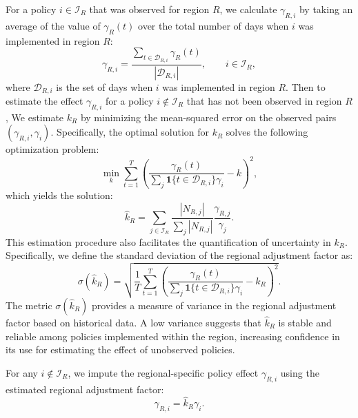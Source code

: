 \documentclass[msom,blindrev]{informs3} %
\begin{document}
For a policy $i \in \mathcal{I}_R$ that was observed for region $R$, we calculate $\gamma_{R,i}$ by taking an average of the value of $\gamma_{R}(t)$ over the total number of days when $i$ was implemented in region $R$:
\begin{equation}
    \gamma_{R,i} = \frac{\sum_{t \in \mathcal{D}_{R,i}} \gamma_{R}(t)}{|\mathcal{D}_{R,i}|}, \qquad  i \in \mathcal{I}_R,
    \label{eq:obsgamma}
\end{equation}
where $\mathcal{D}_{R,i}$ is the set of days when $i$ was implemented in region $R$. Then to estimate the effect $\gamma_{R,i}$ for a policy $i \not \in \mathcal{I}_R$ that has not been observed in region $R$, We estimate $k_R$ by minimizing the mean-squared error on the observed pairs $(\gamma_{R,i},\gamma_i)$. Specifically, the optimal solution for $k_R$ solves the following optimization problem: 
\begin{equation}
    \min_{k} \sum_{t=1}^T \left(\frac{\gamma_R(t)}{\sum_j \mathbf{1}\{t \in \mathcal{D}_{R,i}\} \gamma_i} - k\right)^2, \label{eq:equivalent}
\end{equation}
which yields the solution:
\begin{equation}
    \hat{k}_R = \sum_{j \in \mathcal{I}_R} 
    \frac{|N_{R,j}|}{\sum_j |N_{R,j}|} \frac{ \gamma_{R,j}}{\gamma_{j}}.
\end{equation}
This estimation procedure also facilitates the quantification of uncertainty in $k_R$. Specifically, we define the standard deviation of the regional adjustment factor as:
\begin{equation}
    \sigma( \hat{k}_R) = \sqrt{\frac{1}{T} \sum_{t=1}^T \left(\frac{\gamma_R(t)}{\sum_j \mathbf{1}\{t \in \mathcal{D}_{R,i}\} \gamma_i} - k_R\right)^2}. \label{eq:uncertainty}
\end{equation}
The metric $\sigma( \hat{k}_R)$ provides a measure of variance in the regional adjustment factor based on historical data. A low variance suggests that $ \hat{k}_R$ is stable and reliable among policies implemented within the region, increasing confidence in its use for estimating the effect of unobserved policies.

For any $i \not \in \mathcal{I}_R$, we impute the regional-specific policy effect $\gamma_{R,i}$ using the estimated regional adjustment factor:
\begin{equation}
    \gamma_{R,i} =  \hat{k}_R \gamma_i. \label{eq:uobsgamma}
\end{equation}

\end{document}
